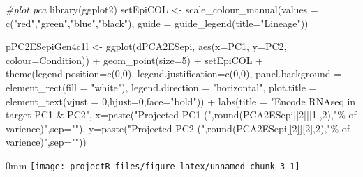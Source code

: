 \documentclass[]{article}
\newcommand{\hlnum}[1]{\textcolor[rgb]{0.816,0.125,0.439}{#1}}%
\newcommand{\hlstr}[1]{\textcolor[rgb]{0.251,0.627,0.251}{#1}}%
\newcommand{\hlcom}[1]{\textcolor[rgb]{0.502,0.502,0.502}{\textit{#1}}}%
\newcommand{\hlstd}[1]{\textcolor[rgb]{0.251,0.251,0.251}{#1}}%
\newenvironment{Shaded}{\begin{myshaded}}{\end{myshaded}}
\newcommand{\DecValTok}[1]{\hlnum{#1}}
\newcommand{\SpecialCharTok}[1]{\hlstr{#1}}
\newcommand{\StringTok}[1]{\hlstr{#1}}
\newcommand{\CommentTok}[1]{\hlcom{#1}}
\newcommand{\OtherTok}[1]{{#1}}
\newcommand{\FunctionTok}[1]{\hlstd{#1}}
\newcommand{\AttributeTok}[1]{{#1}}
\newcommand{\NormalTok}[1]{\hlstd{#1}}
\begin{document}
\begin{Shaded}
\begin{Highlighting}[]
\CommentTok{\#plot pca}
\FunctionTok{library}\NormalTok{(ggplot2)}
\NormalTok{setEpiCOL }\OtherTok{\textless{}{-}} \FunctionTok{scale\_colour\_manual}\NormalTok{(}\AttributeTok{values =} \FunctionTok{c}\NormalTok{(}\StringTok{"red"}\NormalTok{,}\StringTok{"green"}\NormalTok{,}\StringTok{"blue"}\NormalTok{,}\StringTok{"black"}\NormalTok{),}
  \AttributeTok{guide =} \FunctionTok{guide\_legend}\NormalTok{(}\AttributeTok{title=}\StringTok{"Lineage"}\NormalTok{))}

\NormalTok{pPC2ESepiGen4c1l }\OtherTok{\textless{}{-}} \FunctionTok{ggplot}\NormalTok{(dPCA2ESepi, }\FunctionTok{aes}\NormalTok{(}\AttributeTok{x=}\NormalTok{PC1, }\AttributeTok{y=}\NormalTok{PC2, }\AttributeTok{colour=}\NormalTok{Condition)) }\SpecialCharTok{+}
  \FunctionTok{geom\_point}\NormalTok{(}\AttributeTok{size=}\DecValTok{5}\NormalTok{) }\SpecialCharTok{+}\NormalTok{ setEpiCOL }\SpecialCharTok{+}
  \FunctionTok{theme}\NormalTok{(}\AttributeTok{legend.position=}\FunctionTok{c}\NormalTok{(}\DecValTok{0}\NormalTok{,}\DecValTok{0}\NormalTok{), }\AttributeTok{legend.justification=}\FunctionTok{c}\NormalTok{(}\DecValTok{0}\NormalTok{,}\DecValTok{0}\NormalTok{),}
  \AttributeTok{panel.background =} \FunctionTok{element\_rect}\NormalTok{(}\AttributeTok{fill =} \StringTok{"white"}\NormalTok{),}
  \AttributeTok{legend.direction =} \StringTok{"horizontal"}\NormalTok{,}
  \AttributeTok{plot.title =} \FunctionTok{element\_text}\NormalTok{(}\AttributeTok{vjust =} \DecValTok{0}\NormalTok{,}\AttributeTok{hjust=}\DecValTok{0}\NormalTok{,}\AttributeTok{face=}\StringTok{"bold"}\NormalTok{)) }\SpecialCharTok{+}
  \FunctionTok{labs}\NormalTok{(}\AttributeTok{title =} \StringTok{"Encode RNAseq in target PC1 \& PC2"}\NormalTok{,}
  \AttributeTok{x=}\FunctionTok{paste}\NormalTok{(}\StringTok{"Projected PC1 ("}\NormalTok{,}\FunctionTok{round}\NormalTok{(PCA2ESepi[[}\DecValTok{2}\NormalTok{]][}\DecValTok{1}\NormalTok{],}\DecValTok{2}\NormalTok{),}\StringTok{"\% of varience)"}\NormalTok{,}\AttributeTok{sep=}\StringTok{""}\NormalTok{),}
  \AttributeTok{y=}\FunctionTok{paste}\NormalTok{(}\StringTok{"Projected PC2 ("}\NormalTok{,}\FunctionTok{round}\NormalTok{(PCA2ESepi[[}\DecValTok{2}\NormalTok{]][}\DecValTok{2}\NormalTok{],}\DecValTok{2}\NormalTok{),}\StringTok{"\% of varience)"}\NormalTok{,}\AttributeTok{sep=}\StringTok{""}\NormalTok{))}
\end{Highlighting}
\end{Shaded}

\begin{adjustwidth}{\fltoffset}{0mm}
\texttt{[image: projectR\_files/figure-latex/unnamed-chunk-3-1]} \end{adjustwidth}
\end{document}
